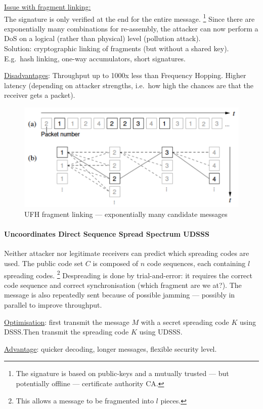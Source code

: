 \underline{Issue with fragment linking:} \\
The signature is only verified at the end for the entire message.%
\footnote{The signature is based on public-keys and a mutually trusted --- but potentially offline --- certificate authority CA.}
Since there are exponentially many combinations for re-assembly, the attacker can now perform a DoS on a logical (rather than physical) level (pollution attack).
\\
Solution: cryptographic linking of fragments (but without a shared key).
E.g.\ hash linking, one-way accumulators, short signatures.

\underline{Disadvantages}:
Throughput up to 1000x less than Frequency Hopping.
Higher latency (depending on attacker strengths, i.e.\ how high the chances are that the receiver gets a packet).

\begin{figure}[h]
	\centering
	\includegraphics[scale=0.4]{images/3-ufh-fragment-linking.png}
	\caption{UFH fragment linking --- exponentially many candidate messages}%
	\label{fig:ufh-fragment-linking}
\end{figure}

\paragraph{Uncoordinates Direct Sequence Spread Spectrum UDSSS}
Neither attacker nor legitimate receivers can predict which spreading codes are used.
The public code set $C$ is composed of $n$ code sequences, each containing $l$ spreading codes.%
\footnote{This allows a message to be fragmented into $l$ pieces.}
Despreading is done by trial-and-error: it requires the correct code sequence and correct synchronisation (which fragment are we at?).
The message is also repeatedly sent because of possible jamming --- possibly in parallel to improve throughput.

\underline{Optimisation}: first transmit the message $M$ with a secret spreading code $K$ using DSSS.\@ Then transmit the spreading code $K$ using UDSSS.\@

\underline{Advantage}: quicker decoding, longer messages, flexible security level.


